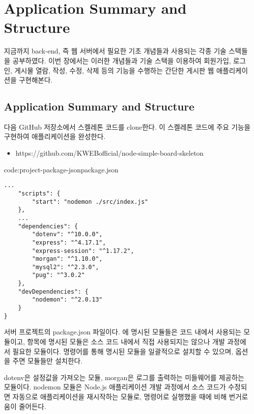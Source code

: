 \section{Application Summary and Structure}\label{sect:application-summary-and-structure}

지금까지 back-end, 즉 웹 서버에서 필요한 기초 개념들과 사용되는 각종 기술 스택들을 공부하였다. 이번 장에서는 이러한 개념들과 기술 스택을 이용하여 회원가입, 로그인, 게시물 열람, 작성, 수정, 삭제 등의 기능을 수행하는 간단한 게시판 웹 애플리케이션을 구현해본다.

\subsection*{Application Summary and Structure}

다음 GitHub 저장소에서 스켈레톤 코드를 clone한다. 이 스켈레톤 코드에 주요 기능을 구현하여 애플리케이션을 완성한다.

\begin{itemize}
    \item https://github.com/KWEBofficial/node-simple-board-skeleton
\end{itemize}

\begin{codeenv}{code:project-package-json}{package.json}\begin{verbatim}
...
    "scripts": {
        "start": "nodemon ./src/index.js"
    },
    ...
    "dependencies": {
        "dotenv": "^10.0.0",
        "express": "^4.17.1",
        "express-session": "^1.17.2",
        "morgan": "^1.10.0",
        "mysql2": "^2.3.0",
        "pug": "^3.0.2"
    },
    "devDependencies": {
        "nodemon": "^2.0.13"
    }
}
\end{verbatim}
\end{codeenv}

\은 서버 프로젝트의 package.json 파일이다. 에 명시된 모듈들은 코드 내에서 사용되는 모듈이고,  항목에 명시된 모듈은 소스 코드 내에서 직접 사용되지는 않으나 개발 과정에서 필요한 모듈이다.  명령어를 통해 명시된 모듈을 일괄적으로 설치할 수 있으며,  옵션을 주면  모듈들만 설치한다.

dotenv은 설정값을 가져오는 모듈, morgan은 로그를 출력하는 미들웨어를 제공하는 모듈이다. nodemon 모듈은 Node.js 애플리케이션 개발 과정에서 소스 코드가 수정되면 자동으로 애플리케이션을 재시작하는 모듈로,  명령어로 실행했을 때에 비해 번거로움이 줄어든다.
\newpage

